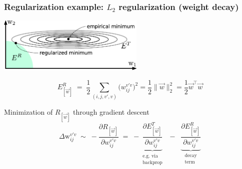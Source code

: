 \begin{frame}\frametitle{Regularization example: $L_2$ regularization (weight decay)}


	\begin{center}
		\includegraphics[width=7cm]{img/empirical_vs_regularized}
	\end{center}
	
	\begin{equation}
		E_{[\vec{w}]}^R \;=\; \frac{1}{2} \sum_{(i, j, v', v)} 
			\big( {w}_{ij}^{v'v} \big)^2 
            = \frac{1}{2} \lVert \vec w \rVert_2^2
            = \frac{1}{2} \vec w^\top \vec w
	\end{equation}
	
	\begin{block}{Minimization of $R_{[\vec w]}$ through gradient descent}
		\begin{equation}
			\Delta \mathrm{w}_{ij}^{v'v} \;\sim\; 
				-\frac{\partial R_{[\vec w]}}{\partial {w}_{ij}^{v'v}}
			\;=\; - \underbrace{\frac{\partial E^T_{[\vec w]}}%
				{\partial {w}_{ij}^{v'v}}}_{
				\substack{\text{e.g. via} \\ \text{backprop}}}
			\;\;-\;\; \underbrace{
            \frac{\partial E^R_{[\vec w]}}{\partial {w}_{ij}^{v'v}}
            }_{
				\substack{\text{decay} \\ \text{term}}}
		\end{equation}
	\end{block}
	
\end{frame}



